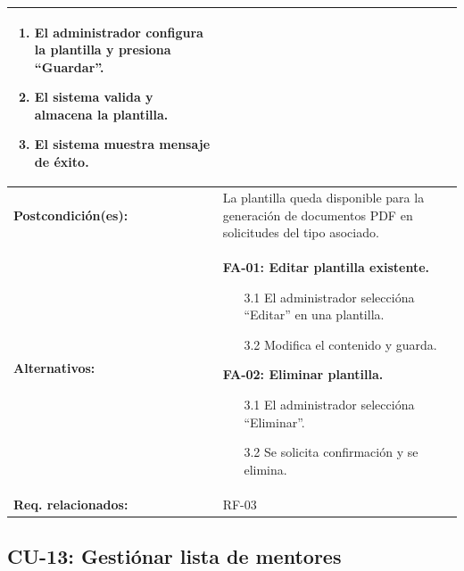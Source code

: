 \begin{longtable}{|L{4cm}|L{9.5cm}|}
\begin{enumerate}[nosep, leftmargin=*]
        \item El administrador configura la plantilla y presiona ``Guardar''.
        \item El sistema valida y almacena la plantilla.
        \item El sistema muestra mensaje de éxito.
    \end{enumerate} \\
    \hline
    \textbf{Postcondición(es):} & La plantilla queda disponible para la generación de documentos PDF en solicitudes del tipo asociado. \\
    \hline
    \textbf{Alternativos:} &
    \textbf{FA-01: Editar plantilla existente.}
    \begin{enumerate}[nosep, leftmargin=*]
        \item[3.1] El administrador seleccióna ``Editar'' en una plantilla.
        \item[3.2] Modifica el contenido y guarda.
    \end{enumerate}
    \vspace{0.2cm}
    \textbf{FA-02: Eliminar plantilla.}
    \begin{enumerate}[nosep, leftmargin=*]
        \item[3.1] El administrador seleccióna ``Eliminar''.
        \item[3.2] Se solicita confirmación y se elimina.
    \end{enumerate} \\
    \hline
    \textbf{Req. relacionados:} & RF-03 \\
    \hline
\end{longtable}

\subsection{CU-13: Gestiónar lista de mentores}

